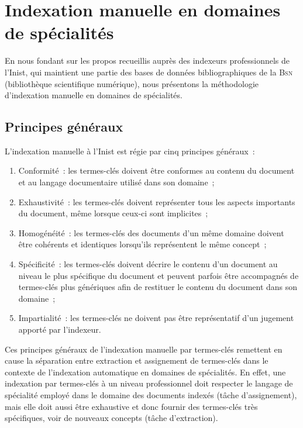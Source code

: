 
  \section{Indexation manuelle en domaines de spécialités}
  \label{sec:main-domain_specific_keyphrase_annotation-manual_keyphrase_annotation}
    En nous fondant sur les  propos recueillis auprès des indexeurs
    professionnels de l'Inist, qui maintient une partie des bases de données
    bibliographiques de la \textsc{Bsn} (bibliothèque scientifique numérique),
    nous présentons la méthodologie d'indexation manuelle en domaines de
    spécialités.

    \subsection{Principes généraux}
    \label{subsec:main-domain_specific_keyphrase_annotation-manual_keyphrase_annotation-principles}
      L'indexation manuelle à l'Inist est régie par cinq principes généraux~:
      \begin{enumerate}
        \item{Conformité~: les termes-clés doivent être conformes au contenu du
              document et au langage documentaire utilisé dans son domaine~;}
        \item{Exhaustivité~: les termes-clés doivent représenter tous les
              aspects importants du document, même lorsque ceux-ci sont
              implicites~;}
        \item{Homogénéité~: les termes-clés des documents d'un même domaine
              doivent être cohérents et identiques lorsqu'ils représentent le
              même concept~;}
        \item{Spécificité~: les termes-clés doivent décrire le contenu d'un
              document au niveau le plus spécifique du document et peuvent
              parfois être accompagnés de termes-clés plus génériques afin de
              restituer le contenu du document dans son domaine~;}
        \item{Impartialité~: les termes-clés ne doivent pas être représentatif
              d'un jugement apporté par l'indexeur.}
      \end{enumerate}

      Ces principes généraux de l'indexation manuelle par termes-clés remettent
      en cause la séparation entre extraction et assignement de termes-clés dans
      le contexte de l'indexation automatique en domaines de spécialités. En
      effet, une indexation par termes-clés à un niveau professionnel doit
      respecter le langage de spécialité employé dans le domaine des documents
      indexés (tâche d'assignement), mais elle doit aussi être exhaustive et
      donc fournir des termes-clés très spécifiques, voir de nouveaux concepts
      (tâche d'extraction).

